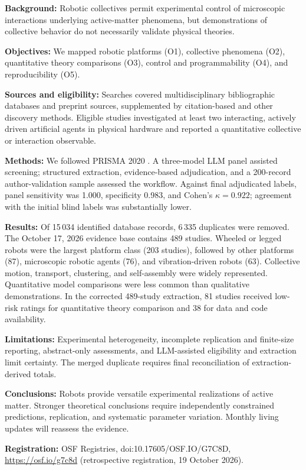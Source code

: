 \noindent\textbf{Background:}
Robotic collectives permit experimental control of
microscopic interactions underlying active-matter
phenomena, but demonstrations of collective behavior
do not necessarily validate physical theories.

\noindent\textbf{Objectives:}
We mapped robotic platforms (O1), collective phenomena
(O2), quantitative theory comparisons (O3), control
and programmability (O4), and reproducibility (O5).

\noindent\textbf{Sources and eligibility:}
Searches covered multidisciplinary bibliographic
databases and preprint sources, supplemented by
citation-based and other discovery methods.
Eligible studies investigated at least two interacting,
actively driven artificial agents in physical hardware
and reported a quantitative collective or interaction
observable.

\noindent\textbf{Methods:}
We followed PRISMA 2020 \cite{Page2021prisma}.
A three-model LLM panel assisted screening;
structured extraction, evidence-based adjudication,
and a 200-record author-validation sample assessed
the workflow. Against final adjudicated labels,
panel sensitivity was 1.000, specificity 0.983,
and Cohen's $\kappa=0.922$; agreement with the
initial blind labels was substantially lower.

\noindent\textbf{Results:}
Of 15\,034 identified database records,
6\,335 duplicates were removed.
The October 17, 2026 evidence base
contains 489 studies.
Wheeled or legged robots were the largest platform
class (203 studies), followed by other platforms
(87), microscopic robotic agents (76), and
vibration-driven robots (63).
Collective motion, transport, clustering,
and self-assembly were widely represented.
Quantitative model comparisons were less
common than qualitative demonstrations.
In the corrected 489-study extraction,
81 studies received low-risk ratings for
quantitative theory comparison and 38 for
data and code availability.

\noindent\textbf{Limitations:}
Experimental heterogeneity, incomplete replication
and finite-size reporting, abstract-only assessments,
and LLM-assisted eligibility and extraction limit
certainty. The merged duplicate requires final
reconciliation of extraction-derived totals.

\noindent\textbf{Conclusions:}
Robots provide versatile experimental realizations
of active matter. Stronger theoretical conclusions
require independently constrained predictions,
replication, and systematic parameter variation.
Monthly living updates will reassess the evidence.

\noindent\textbf{Registration:}
OSF Registries, doi:10.17605/OSF.IO/G7C8D,
\url{https://osf.io/g7c8d}
(retrospective registration, 19 October 2026).